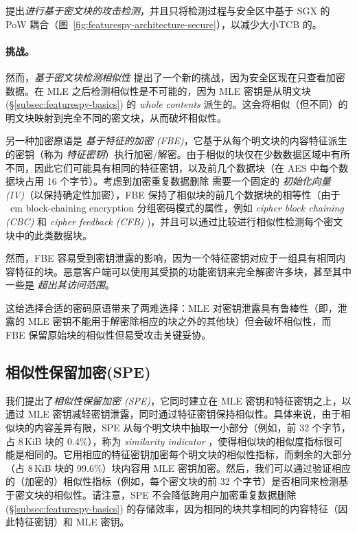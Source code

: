 \sysnameF 提出{\em 进行基于密文块的攻击检测}，并且只将检测过程与安全区中基于 SGX 的 PoW 耦合（图~\ref{fig:featurespy-architecture-secure}），以减少大小TCB 的。


\paragraph*{挑战。}
然而，{\em 基于密文块检测相似性} 提出了一个新的挑战，因为安全区现在只查看加密数据。在 MLE 之后检测相似性是不可能的，因为 MLE 密钥是从明文块 (\S\ref{subsec:featurespy-basics}) 的 {\em whole contents} 派生的。这会将相似（但不同）的明文块映射到完全不同的密文块，从而破坏相似性。

另一种加密原语是 {\em 基于特征的加密 (FBE)}，它基于从每个明文块的内容特征派生的密钥（称为 {\em 特征密钥}）执行加密/解密。由于相似的块仅在少数数据区域中有所不同，因此它们可能具有相同的特征密钥，以及前几个数据块（在 AES 中每个数据块占用 16 个字节）。考虑到加密重复数据删除 \cite{douceur02, shah15} 需要一个固定的 {\em 初始化向量 (IV)}（以保持确定性加密），FBE 保持了相似块的前几个数据块的相等性（由于 {\ em block-chaining encryption} 分组密码模式的属性，例如 {\em cipher block chaining (CBC)} 和 {\em cipher feedback (CFB)} \cite{dworkin01})，并且可以通过比较进行相似性检测每个密文块中的此类数据块。


然而，FBE 容易受到密钥泄露的影响，因为一个特征密钥对应于一组具有相同内容特征的块。恶意客户端可以使用其受损的功能密钥来完全解密许多块，甚至其中一些是 {\em 超出其访问范围}。


这给选择合适的密码原语带来了两难选择：MLE 对密钥泄露具有鲁棒性（即，泄露的 MLE 密钥不能用于解密除相应的块之外的其他块）但会破坏相似性，而 FBE 保留原始块的相似性但易受攻击关键妥协。

\subsection{相似性保留加密(SPE)}
\label{subsec:featurespy-spe}

我们提出了{\em 相似性保留加密 (SPE)}，它同时建立在 MLE 密钥和特征密钥之上，以通过 MLE 密钥减轻密钥泄露，同时通过特征密钥保持相似性。具体来说，由于相似块的内容差异有限，SPE 从每个明文块中抽取一小部分（例如，前 32 个字节，占 8\,KiB 块的 0.4\%），称为 {\em similarity indicator} ，使得相似块的相似度指标很可能是相同的。它用相应的特征密钥加密每个明文块的相似性指标，而剩余的大部分（占 8\,KiB 块的 99.6\%）块内容用 MLE 密钥加密。然后，我们可以通过验证相应的（加密的）相似性指标（例如，每个密文块的前 32 个字节）是否相同来检测基于密文块的相似性。请注意，SPE 不会降低跨用户加密重复数据删除 (\S\ref{subsec:featurespy-basics}) 的存储效率，因为相同的块共享相同的内容特征（因此特征密钥）和 MLE 密钥。

